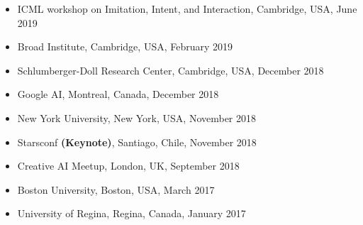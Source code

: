 \documentclass[paper=letter,fontsize=11pt]{scrartcl} %
\newcommand{\TalkEntry}[4]{
		\noindent #1, #2, #3 #4}
\begin{document}
\begin{itemize}
\item\TalkEntry{ICML workshop on Imitation, Intent, and Interaction}{Cambridge, USA}{June 2019}{} 
\item\TalkEntry{Broad Institute}{Cambridge, USA}{February 2019}{} 
\item\TalkEntry{Schlumberger-Doll Research Center}{Cambridge, USA}{December 2018}{} 
\item\TalkEntry{Google AI}{Montreal, Canada}{December 2018}{} 
\item\TalkEntry{New York University}{New York, USA}{November 2018}{} 
\item\TalkEntry{Starsconf \textbf{(Keynote)}}{Santiago, Chile}{November 2018}{} 

\item\TalkEntry{Creative AI Meetup}{London, UK}{September 2018}{} %

\item\TalkEntry{%
Boston University}{Boston, USA}{March 2017}{} %

\item\TalkEntry{%
University of Regina}{Regina, Canada}{January 2017}{} %
\end{itemize}
\end{document}
